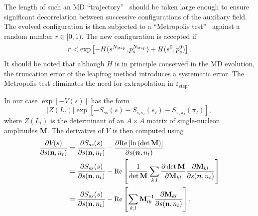 The length of such an MD \textquotedblleft trajectory\textquotedblright%
\ should be taken large enough to ensure significant decorrelation between
successive configurations of the auxiliary field. The evolved configuration
is
then subjected to a \textquotedblleft Metropolis test\textquotedblright%
\ against a random number $r\in\lbrack0,1)$.  The new configuration is accepted if
\begin{equation}
r<\exp\left[  -H(s^{N_{\mathrm{step}}},p^{N_{\rm step }}_s)+H(s^{0}%
,p_s^{0})\right]  .
\end{equation}
It
should be noted that although $H$ is in principle conserved in the MD
evolution, the truncation error of the leapfrog method introduces a systematic
error. The Metropolis test eliminates the need for extrapolation in
$\varepsilon_{\mathrm{step}}$. 

In our case $\exp[-V(s)]$ has the form 
\begin{equation}
|Z(L_t)|\exp{\left[-S_{ss}(s)
-S_{s_Is_I}(s_I)
-S_{\pi_I\pi_I}(\pi_I)\right]},
\end{equation} 
where $Z(L_t)$ is the determinant
of an $A\times A$ matrix of single-nucleon amplitudes {\bf M}.  The derivative of
$V_{}$ is then computed using%
\begin{align}
\frac{\partial V_{}(s)}{\partial s({\bf n},n_t)}  &  =\frac{\partial
S_{ss}(s)}{\partial s({\bf n},n_t)}- \frac{\partial {\rm Re} \left[
\ln \left( \det\mathbf{M} \right) \right]}{\partial s(\vec
{n},n_t)} \nonumber\\
  &  =\frac{\partial
S_{ss}(s)}{\partial s({\bf n},n_t)}- {\rm Re} \left[ \frac{1}{\det\mathbf{M}}\sum
_{k,l}\frac{\partial\det\mathbf{M}}{\partial \mathbf{M}
_{kl}}\frac{\partial  \mathbf{M}_{kl}}{\partial s(\vec
{n},n_t)} \right] \nonumber\\
&  =\frac{\partial S_{ss}(s)}{\partial s({\bf n},n_t)}- {\rm Re} \left[
\sum_{k,l}
\mathbf{M}^{-1}  _{lk}\frac{\partial  \mathbf{M}
_{kl}}{\partial s({\bf n},n_t)} \right].
\end{align}

